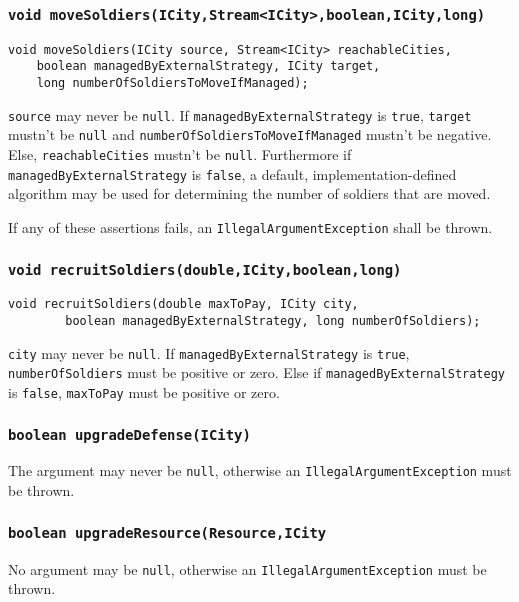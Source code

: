 \documentclass{article}
\begin{document}
\subsubsection{\texttt{void moveSoldiers(ICity,Stream<ICity>,boolean,ICity,long)}}
\begin{verbatim}
void moveSoldiers(ICity source, Stream<ICity> reachableCities,
	boolean managedByExternalStrategy, ICity target,
	long numberOfSoldiersToMoveIfManaged);
\end{verbatim}
\texttt{source} may never be \texttt{null}. 
If \texttt{managedByExternalStrategy} is \texttt{true}, \texttt{target} mustn't be \texttt{null} and
\texttt{numberOfSoldiersToMoveIfManaged} mustn't be negative.
Else, \texttt{reachableCities} mustn't be \texttt{null}.
Furthermore if \texttt{managedByExternalStrategy} is \texttt{false}, a default, implementation-defined
algorithm may be used for determining the number of soldiers that are moved.

If any of these assertions fails, an \texttt{IllegalArgumentException} shall be thrown.

\subsubsection{\texttt{void recruitSoldiers(double,ICity,boolean,long)}}
\begin{verbatim}
void recruitSoldiers(double maxToPay, ICity city,
		boolean managedByExternalStrategy, long numberOfSoldiers);
\end{verbatim}
\texttt{city} may never be \texttt{null}.
If \texttt{managedByExternalStrategy} is \texttt{true}, \texttt{numberOfSoldiers} must be positive or zero.
Else if \texttt{managedByExternalStrategy} is \texttt{false}, \texttt{maxToPay} must be positive or zero.

\subsubsection{\texttt{boolean upgradeDefense(ICity)}}
The argument may never be \texttt{null}, otherwise an \texttt{IllegalArgumentException} must be thrown.

\subsubsection{\texttt{boolean upgradeResource(Resource,ICity}}
No argument may be \texttt{null}, otherwise an \texttt{IllegalArgumentException} must be thrown.
\end{document}
